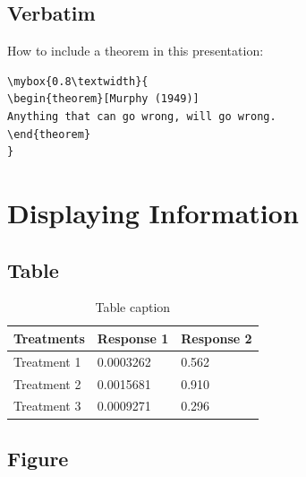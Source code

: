 \clearpage


\subsection{Verbatim}

How to include a theorem in this presentation:
\begin{verbatim}
\mybox{0.8\textwidth}{
\begin{theorem}[Murphy (1949)]
Anything that can go wrong, will go wrong.
\end{theorem}
}
\end{verbatim}

\clearpage



\section{Displaying Information}

\clearpage


\subsection{Table}

\begin{table}[h]
\centering
\begin{tabular}{l l l}
\toprule
\textbf{Treatments} & \textbf{Response 1} & \textbf{Response 2}\\
\midrule
Treatment 1 & 0.0003262 & 0.562 \\
Treatment 2 & 0.0015681 & 0.910 \\
Treatment 3 & 0.0009271 & 0.296 \\
\bottomrule
\end{tabular}
\caption{Table caption}
\end{table}

\clearpage


\subsection{Figure}



\clearpage

